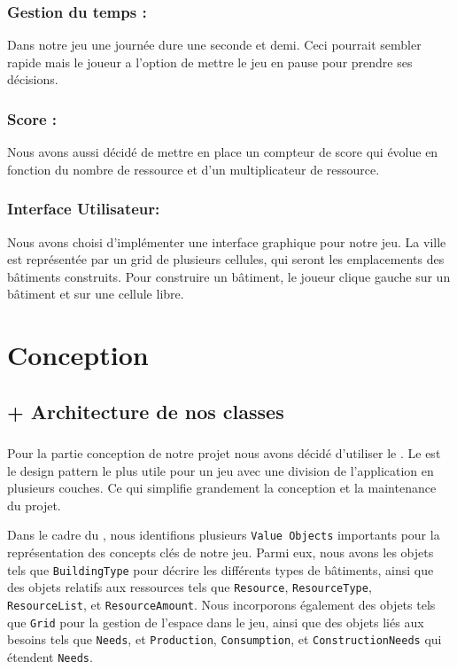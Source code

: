 \documentclass[a4paper,11pt]{article}
\begin{document}
\subsubsection{Gestion du temps :}
Dans notre jeu une journée dure une seconde et demi. Ceci pourrait sembler rapide mais le joueur a l'option de mettre le jeu en pause pour prendre ses décisions.

\subsubsection{Score :}
Nous avons aussi décidé de mettre en place un compteur de score qui évolue en fonction du nombre de ressource et d'un multiplicateur de ressource.

\subsubsection{Interface Utilisateur:}
Nous avons choisi d'implémenter une interface graphique pour notre jeu. La ville est représentée par un grid de plusieurs cellules, qui seront les emplacements des bâtiments construits.
Pour construire un bâtiment, le joueur clique gauche sur un bâtiment et sur une cellule libre.

\clearpage

\section{Conception}
\subsection{ + Architecture de nos classes} %
\subsubsection*{} %
Pour la partie conception de notre projet nous avons décidé d'utiliser le . Le  est le design pattern le plus utile pour un jeu avec une division de l'application en plusieurs couches. Ce qui simplifie grandement la conception et la maintenance du projet.

Dans le cadre du , nous identifions plusieurs \texttt{Value Objects} importants pour la représentation des concepts clés de notre jeu. Parmi eux, nous avons les objets tels que \texttt{BuildingType} pour décrire les différents types de bâtiments, ainsi que des objets relatifs aux ressources tels que \texttt{Resource}, \texttt{ResourceType}, \texttt{ResourceList}, et \texttt{ResourceAmount}. Nous incorporons également des objets tels que \texttt{Grid} pour la gestion de l'espace dans le jeu, ainsi que des objets liés aux besoins tels que \texttt{Needs}, et \texttt{Production}, \texttt{Consumption}, et \texttt{ConstructionNeeds} qui étendent \texttt{Needs}.
\end{document}

